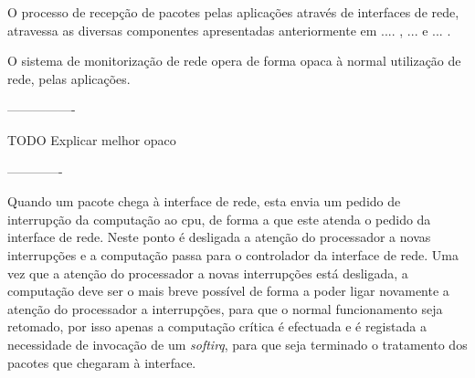 






O processo de recepção de pacotes pelas aplicações através de interfaces de rede, atravessa as diversas componentes apresentadas anteriormente em .... , ... e ... .

O sistema de monitorização de rede opera de forma opaca à normal utilização de rede, pelas aplicações.

----------------

TODO
Explicar melhor opaco

-------------

Quando um pacote chega à interface de rede, esta envia um pedido de interrupção da computação ao cpu, de forma a que este atenda o pedido da interface de rede.
Neste ponto é desligada a atenção do processador a novas interrupções e a computação passa para o controlador da interface de rede.
Uma vez que a atenção do processador a novas interrupções está desligada, a computação deve ser o mais breve possível de forma a poder ligar novamente a atenção do processador a interrupções, para que o normal funcionamento seja retomado, por isso apenas a computação crítica é efectuada e é registada a necessidade de invocação de um \textit{softirq}, para que seja terminado o tratamento dos pacotes que chegaram à interface.

